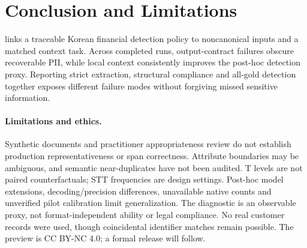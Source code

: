 \section{Conclusion and Limitations}
\label{sec:conclusion}

\kiii{} links a traceable Korean financial detection policy to noncanonical inputs and a matched context task. Across completed runs, output-contract failures obscure recoverable PII, while local context consistently improves the post-hoc detection proxy. Reporting strict extraction, structural compliance and all-gold detection together exposes different failure modes without forgiving missed sensitive information.

\paragraph{Limitations and ethics.}
Synthetic documents and practitioner appropriateness review do not establish production representativeness or span correctness. Attribute boundaries may be ambiguous, and semantic near-duplicates have not been audited. T levels are not paired counterfactuals; STT frequencies are design settings. Post-hoc model extensions, decoding/precision differences, unavailable native counts and unverified pilot calibration limit generalization. The diagnostic is an observable proxy, not format-independent ability or legal compliance. No real customer records were used, though coincidental identifier matches remain possible. The preview is CC BY-NC 4.0; a formal release will follow.
